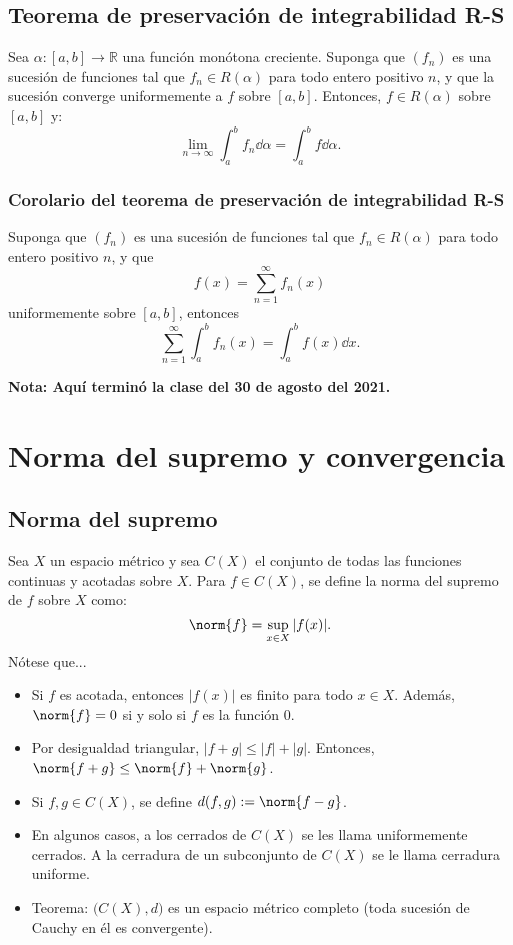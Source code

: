 \documentclass{article}
\begin{document}
\subsection*{Teorema de preservación de integrabilidad R-S}

Sea $\alpha:[a,b]\to\mathbb{R}$ una función monótona creciente. Suponga que $(f_n)$ es una sucesión de funciones tal que $f_n\in R(\alpha)$ para todo entero positivo $n$, y que la sucesión converge uniformemente a $f$ sobre $[a,b]$. Entonces, $f\in R(\alpha)$ sobre $[a,b]$ y:
$$\lim_{n\to\infty}\int_a^b f_n\dd{\alpha}=\int_a^b f\dd{\alpha}.$$

\subsubsection*{Corolario del teorema de preservación de integrabilidad R-S}

Suponga que $(f_n)$ es una sucesión de funciones tal que $f_n\in R(\alpha)$ para todo entero positivo $n$, y que
$$f(x)=\sum_{n=1}^{\infty}f_n(x)$$
uniformemente sobre $[a,b]$, entonces
$$\sum_{n=1}^{\infty}\int_a^b f_n(x)=\int_a^b f(x)\dd{x}.$$

\vspace{10pt}
\textbf{Nota: Aquí terminó la clase del 30 de agosto del 2021.}

\newpage
\section*{Norma del supremo y convergencia}

\subsection*{Norma del supremo}

Sea $X$ un espacio métrico y sea $C(X)$ el conjunto de todas las funciones continuas y acotadas sobre $X$. Para $f\in C(X)$, se define la norma del supremo de $f$ sobre $X$ como:
$$\norm{f}=\sup_{x\in X}|f(x)|.$$
Nótese que...
\begin{itemize}
\item Si $f$ es acotada, entonces $|f(x)|$ es finito para todo $x\in X$. Además, $\norm{f}=0$ si y solo si $f$ es la función 0.

\item Por desigualdad triangular, $|f+g|\leq|f|+|g|$. Entonces, $\norm{f+g}\leq\norm{f}+\norm{g}$.

\item Si $f,g\in C(X)$, se define $d(f,g):=\norm{f-g}$.

\item En algunos casos, a los cerrados de $C(X)$ se les llama uniformemente cerrados. A la cerradura de un subconjunto de $C(X)$ se le llama cerradura uniforme.

\item Teorema: $\big(C(X),d\big)$ es un espacio métrico completo (toda sucesión de Cauchy en él es convergente).
\end{itemize}
\end{document}
